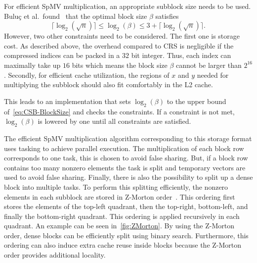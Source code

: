 \documentclass{siamart220329}
\begin{document}
For efficient SpMV multiplication, an appropriate subblock size needs to be used. Buluç et al.\ found~\cite{SpMV-CSB} that the optimal block size $\beta$ satisfies
\begin{equation}\label{eq:CSB-BlockSize}
    \lceil \log_2\left(\sqrt{n}\right)\rceil \leq \log_2(\beta) \leq 3 + \lceil \log_2\left(\sqrt{n}\right) \rceil.
\end{equation}
However, two other constraints need to be considered. The first one is storage cost. As described above, the overhead compared to CRS is negligible if the compressed indices can be packed in a $32$ bit integer. Thus, each index can maximally take up $16$ bits which means the block size $\beta$ cannot be larger than $2^{16}$. Secondly, for efficient cache utilization, the regions of $x$ and $y$ needed for multiplying the subblock should also fit comfortably in the L2 cache.

This leads to an implementation that sets $\log_2(\beta)$ to the upper bound of~\cref{eq:CSB-BlockSize} and checks the constraints. If a constraint is not met, $\log_2(\beta)$ is lowered by one until all constraints are satisfied.

The efficient SpMV multiplication algorithm corresponding to this storage format uses tasking to achieve parallel execution. The multiplication of each block row corresponds to one task, this is chosen to avoid false sharing. But, if a block row contains too many nonzero elements the task is split and temporary vectors are used to avoid false sharing. Finally, there is also the possibility to split up a dense block into multiple tasks. To perform this splitting efficiently, the nonzero elements in each subblock are stored in Z-Morton order~\cite{ZMorton}. This ordering first stores the elements of the top-left quadrant, then the top-right, bottom-left, and finally the bottom-right quadrant. This ordering is applied recursively in each quadrant. An example can be seen in~\cref{fig:ZMorton}. By using the Z-Morton order, dense blocks can be efficiently split using binary search. Furthermore, this ordering can also induce extra cache reuse inside blocks because the Z-Morton order provides additional locality.


\end{document}
